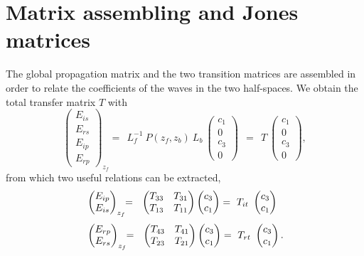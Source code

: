 \section{Matrix assembling and Jones matrices}

The global propagation matrix and the two transition matrices are assembled in order to relate the coefficients of the waves in the two half-spaces.
We obtain the total transfer matrix $T$ with
$$
\begin{pmatrix}
E_{is}\\
E_{rs}\\
E_{ip}\\
E_{rp}
\end{pmatrix}_{z_f}
\!\!
= 
\ \ 
L_f^{-1}\ P(z_f, z_b)\ L_b \ 
\begin{pmatrix}
c_1\\ 0 \\ c_3\\ 0
\end{pmatrix} 
\ \ 
= 
\ \ 
T \ 
\begin{pmatrix}
c_1\\ 0 \\ c_3\\ 0
\end{pmatrix},
$$
from which two useful relations can be extracted,
\begin{align*}
& 
\begin{pmatrix}
E_{ip} \\ E_{is}
\end{pmatrix}_{z_f} \!\! = \ \ 
\begin{pmatrix}
T_{33} & T_{31} \\
T_{13} & T_{11} 
\end{pmatrix}
\begin{pmatrix}
c_3 \\ c_1
\end{pmatrix} = \ T_{it} \ 
\begin{pmatrix}
c_3 \\ c_1
\end{pmatrix}\hphantom{.} 
\\[3pt]
&
\begin{pmatrix}
E_{rp} \\ E_{rs} 
\end{pmatrix}_{z_f} \!\! = \ \ 
\begin{pmatrix}
T_{43} & T_{41} \\
T_{23} & T_{21} 
\end{pmatrix}
\begin{pmatrix}
c_3\\ c_1
\end{pmatrix} =\ T_{rt} \ 
\begin{pmatrix}
c_3\\ c_1
\end{pmatrix}.
\end{align*}

